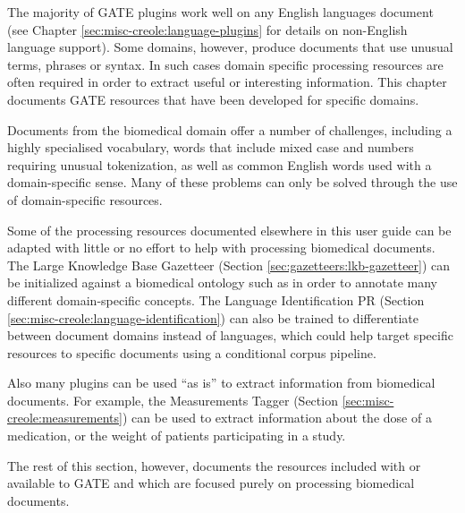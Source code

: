 \nnormalsize
%
The majority of GATE plugins work well on any English languages document (see Chapter
\ref{sec:misc-creole:language-plugins} for details on non-English language support).
Some domains, however, produce documents that use unusual terms, phrases or syntax.
In such cases domain specific processing resources are often required in order to
extract useful or interesting information. This chapter documents GATE resources
that have been developed for specific domains.

Documents from the biomedical domain offer a number of challenges, including a highly
specialised vocabulary, words that include mixed case and numbers requiring unusual
tokenization, as well as common English words used with a domain-specific sense.
Many of these problems can only be solved through the use of domain-specific resources.

Some of the processing resources documented elsewhere in this user guide can be
adapted with little or no effort to help with processing biomedical documents.
The Large Knowledge Base Gazetteer (Section \ref{sec:gazetteers:lkb-gazetteer}) can be initialized
against a biomedical ontology such as  in order
to annotate many different domain-specific concepts. The Language Identification PR
(Section \ref{sec:misc-creole:language-identification}) can also be trained to differentiate between
document domains instead of languages, which could help target specific resources to specific documents
using a conditional corpus pipeline.

Also many plugins can be used ``as is'' to extract information from
biomedical documents. For example, the Measurements Tagger (Section \ref{sec:misc-creole:measurements})
can be used to extract information about the dose of a medication, or the weight of patients participating in a study.

The rest of this section, however, documents the resources included with or available to GATE and which are
focused purely on processing biomedical documents.

